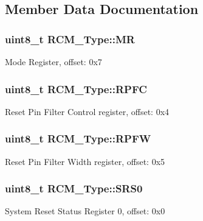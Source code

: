 \subsection{Member Data Documentation}
\subsubsection[{\texorpdfstring{MR}{MR}}]{ uint8\+\_\+t R\+C\+M\+\_\+\+Type\+::\+MR}\hypertarget{structRCM__Type_a546abcdcfe7309b51a89ae73612a02a0}{}\label{structRCM__Type_a546abcdcfe7309b51a89ae73612a02a0}
Mode Register, offset\+: 0x7 
\subsubsection[{\texorpdfstring{R\+P\+FC}{RPFC}}]{ uint8\+\_\+t R\+C\+M\+\_\+\+Type\+::\+R\+P\+FC}\hypertarget{structRCM__Type_ad0261f1d5010d46de000a3a9714b4c6d}{}\label{structRCM__Type_ad0261f1d5010d46de000a3a9714b4c6d}
Reset Pin Filter Control register, offset\+: 0x4 
\subsubsection[{\texorpdfstring{R\+P\+FW}{RPFW}}]{ uint8\+\_\+t R\+C\+M\+\_\+\+Type\+::\+R\+P\+FW}\hypertarget{structRCM__Type_a449e78f6ff13d0f186b722a140027d6b}{}\label{structRCM__Type_a449e78f6ff13d0f186b722a140027d6b}
Reset Pin Filter Width register, offset\+: 0x5 
\subsubsection[{\texorpdfstring{S\+R\+S0}{SRS0}}]{ uint8\+\_\+t R\+C\+M\+\_\+\+Type\+::\+S\+R\+S0}\hypertarget{structRCM__Type_a9e4e331c458808ec57a393932bf91e65}{}\label{structRCM__Type_a9e4e331c458808ec57a393932bf91e65}
System Reset Status Register 0, offset\+: 0x0 
